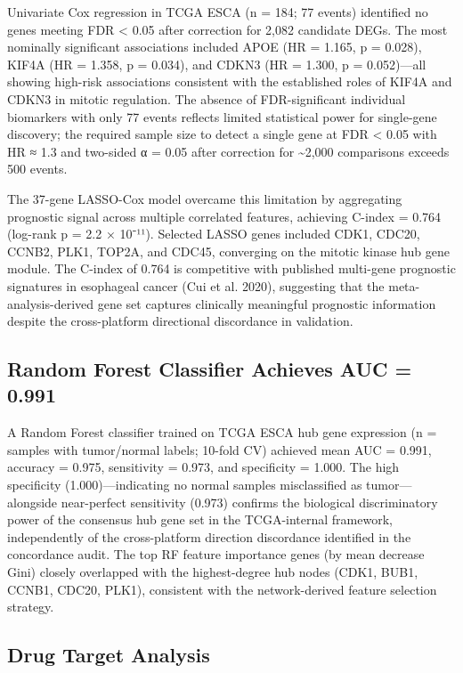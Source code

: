 \documentclass[
  12pt,
]{article}
\begin{document}
Univariate Cox regression in TCGA ESCA (n = 184; 77 events) identified
no genes meeting FDR \textless{} 0.05 after correction for 2,082
candidate DEGs. The most nominally significant associations included
APOE (HR = 1.165, p = 0.028), KIF4A (HR = 1.358, p = 0.034), and CDKN3
(HR = 1.300, p = 0.052)---all showing high-risk associations consistent
with the established roles of KIF4A and CDKN3 in mitotic regulation. The
absence of FDR-significant individual biomarkers with only 77 events
reflects limited statistical power for single-gene discovery; the
required sample size to detect a single gene at FDR \textless{} 0.05
with HR ≈ 1.3 and two-sided α = 0.05 after correction for
\textasciitilde2,000 comparisons exceeds 500 events.

The 37-gene LASSO-Cox model overcame this limitation by aggregating
prognostic signal across multiple correlated features, achieving C-index
= 0.764 (log-rank p = 2.2 × 10⁻¹¹). Selected LASSO genes included CDK1,
CDC20, CCNB2, PLK1, TOP2A, and CDC45, converging on the mitotic kinase
hub gene module. The C-index of 0.764 is competitive with published
multi-gene prognostic signatures in esophageal cancer (Cui et al. 2020),
suggesting that the meta-analysis-derived gene set captures clinically
meaningful prognostic information despite the cross-platform directional
discordance in validation.

\subsection{Random Forest Classifier Achieves AUC =
0.991}\label{random-forest-classifier-achieves-auc-0.991}

A Random Forest classifier trained on TCGA ESCA hub gene expression (n =
samples with tumor/normal labels; 10-fold CV) achieved mean AUC = 0.991,
accuracy = 0.975, sensitivity = 0.973, and specificity = 1.000. The high
specificity (1.000)---indicating no normal samples misclassified as
tumor---alongside near-perfect sensitivity (0.973) confirms the
biological discriminatory power of the consensus hub gene set in the
TCGA-internal framework, independently of the cross-platform direction
discordance identified in the concordance audit. The top RF feature
importance genes (by mean decrease Gini) closely overlapped with the
highest-degree hub nodes (CDK1, BUB1, CCNB1, CDC20, PLK1), consistent
with the network-derived feature selection strategy.

\subsection{Drug Target Analysis}\label{drug-target-analysis}
\end{document}
